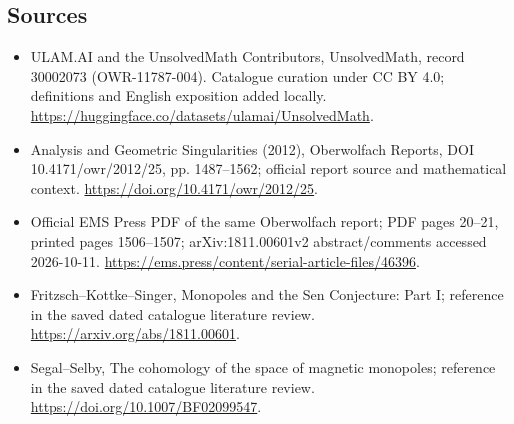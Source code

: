 \documentclass[11pt]{article}
\begin{document}
\subsection{Sources}
\begin{itemize}
\item[\hypertarget{source:30002073:1}{S1}] ULAM.AI and the UnsolvedMath Contributors, UnsolvedMath, record 30002073 (OWR-11787-004). Catalogue curation under CC BY 4.0; definitions and English exposition added locally.
\url{https://huggingface.co/datasets/ulamai/UnsolvedMath}.
\item[\hypertarget{source:30002073:2}{S2}] Analysis and Geometric Singularities (2012), Oberwolfach Reports, DOI 10.4171/owr/2012/25, pp. 1487--1562; official report source and mathematical context.
\url{https://doi.org/10.4171/owr/2012/25}.
\item[\hypertarget{source:30002073:3}{S3}] Official EMS Press PDF of the same Oberwolfach report; PDF pages 20--21, printed pages 1506--1507; arXiv:1811.00601v2 abstract/comments accessed 2026-10-11.
\url{https://ems.press/content/serial-article-files/46396}.
\item[\hypertarget{source:30002073:4}{S4}] Fritzsch--Kottke--Singer, Monopoles and the Sen Conjecture: Part I; reference in the saved dated catalogue literature review.
\url{https://arxiv.org/abs/1811.00601}.
\item[\hypertarget{source:30002073:5}{S5}] Segal--Selby, The cohomology of the space of magnetic monopoles; reference in the saved dated catalogue literature review.
\url{https://doi.org/10.1007/BF02099547}.
\end{itemize}
\label{end:30002073}
\end{document}
